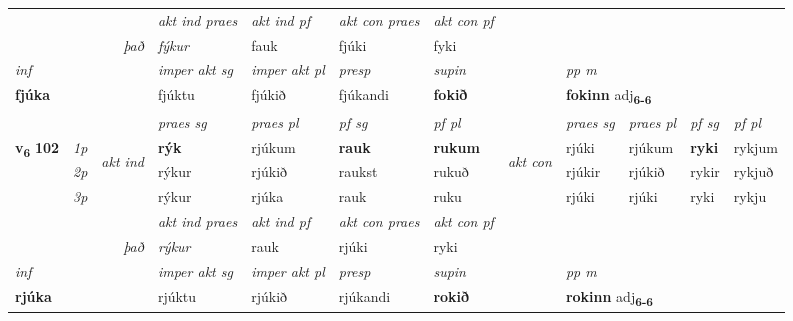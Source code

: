 \begin{longtable}[l]{X>{\footnotesize\itshape}llXXXXlXXXX}
   && &  \textit{akt ind praes} & \textit{akt ind pf} & \textit{akt con praes} & \textit{akt con pf} \\*
\multicolumn{3}{r}{\textit{það}} & fýkur & fauk & fjúki & fyki \\*

\cmidrule{4-7}
   {\textit{inf}} & &  & \textit{imper akt sg} & \textit{imper akt pl}   & \textit{presp} & \textit{supin}  && \textit{pp m} \\*
  {\textbf{fjúka}} & && fjúktu  & fjúkið   & fjúkandi &  \textbf{fokið}  && \multicolumn{2}{l}{\textbf{fokinn} adj\textbf{\textsubscript{6-6}}} \\*

\midrule

 & &   & \textit{praes sg}  & \textit{praes pl}    & \textit{ pf sg} & \textit{pf pl} & & \textit{praes sg}  & \textit{praes pl}    & \textit{pf sg} & \textit{pf pl }  \\ \cmidrule{4-7} \cmidrule{9-12}
 \multirow{2}{*}{{{\textbf{v{\textsubscript{6}}} \Large{\textbf{102}}}}}  & 1p & \multirow{3}{*}{\begin{turn}{90}\textit{akt ind}\end{turn}} & \textbf{rýk} & rjúkum & \textbf{rauk} & \textbf{rukum} & \multirow{3}{*}{\begin{turn}{90}\textit{akt con}\end{turn}} &rjúki & rjúkum & \textbf{ryki} & rykjum\\*
 & 2p &  &  rýkur  & rjúkið & raukst & rukuð & & rjúkir & rjúkið & rykir & rykjuð \\*
 & 3p &  & rýkur & rjúka & rauk & ruku & & rjúki & rjúki& ryki & rykju \\*
\cmidrule{4-7} \cmidrule{9-12}

   && &  \textit{akt ind praes} & \textit{akt ind pf} & \textit{akt con praes} & \textit{akt con pf} \\*
\multicolumn{3}{r}{\textit{það}} & rýkur & rauk & rjúki & ryki \\*

\cmidrule{4-7}
   {\textit{inf}} & &  & \textit{imper akt sg} & \textit{imper akt pl}   & \textit{presp} & \textit{supin}  && \textit{pp m} \\*
  {\textbf{rjúka}} & && rjúktu  & rjúkið   & rjúkandi &  \textbf{rokið}  && \multicolumn{2}{l}{\textbf{rokinn} adj\textbf{\textsubscript{6-6}}} \\*

\midrule


\end{longtable}
